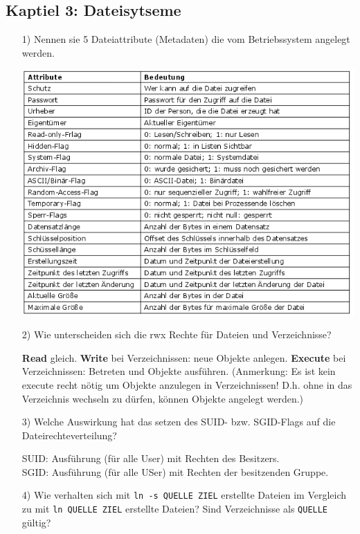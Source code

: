 \documentclass[11pt,a4paper]{article}
\begin{document}
\subsection*{Kaptiel 3: Dateisytseme}
\begin{itemize}
\item[1)] Nennen sie 5 Dateiattribute (Metadaten) die vom Betriebssystem angelegt werden.

\includegraphics[scale=0.8]{dateiattribute.png}

\item[2)] Wie unterscheiden sich die rwx Rechte für Dateien und Verzeichnisse?

\textbf{Read} gleich. \textbf{Write} bei Verzeichnissen: neue Objekte anlegen. \textbf{Execute} bei Verzeichnissen: Betreten und Objekte ausführen. (Anmerkung: Es ist kein execute recht nötig um Objekte anzulegen in Verzeichnissen! D.h. ohne in das Verzeichnis wechseln zu dürfen, können Objekte angelegt werden.)

\item[3)] Welche Auswirkung hat das setzen des SUID- bzw. SGID-Flags auf die Dateirechteverteilung?

SUID: Ausführung (für alle User) mit Rechten des Besitzers.\\
SGID: Ausführung (für alle USer) mit Rechten der besitzenden Gruppe.

\item[4)] Wie verhalten sich mit \texttt{ln -s QUELLE ZIEL} erstellte Dateien im Vergleich zu mit \texttt{ln QUELLE ZIEL} erstellte Dateien? Sind Verzeichnisse als \texttt{QUELLE} gültig?\\


\end{itemize}
\end{document}
